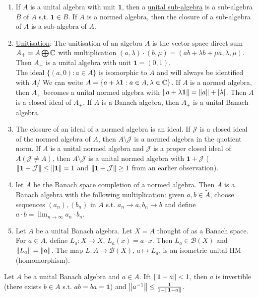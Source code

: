 \documentclass{article}
\begin{document}
\begin{enumerate}
    \item If $A$ is a unital algebra with unit $\mathbf{1}$, then a \noindent\underline{unital sub-algebra} is a sub-algebra $B$ of $A$ s.t. $\mathbf{1}\in B$. If $A$ is a normed algebra, then the closure of a sub-algebra of $A$ is a sub-algebra of $A$.
    \item \noindent\underline{Unitisation}: The unitisation of an algebra $A$ is the vector space direct sum $A_+ = A\bigoplus\mathbb{C}$ with multiplication $(a, \lambda)\cdot (b, \mu)=(ab+\lambda b+\mu a, \lambda, \mu)$. Then $A_+$ is a unital algebra with unit $\mathbf{1}=(0,1)$.\\

    The ideal $\{(a,0):a\in A\}$ is isomorphic to $A$ and will always be identified with $A$/ We can weite $A=\{a+\lambda\mathbf{1}:a\in A, \lambda\in \mathbb{C}\}$. If $A$ is a normed algebra, then $A_+$ becomes a unital normed algebra with $\left\lVert a+\lambda\mathbf{1}\right\rVert=\left\lVert a\right\rVert+|\lambda|$. Then $A$ is a closed ideal of $A_+$. If $A$ is a Banach algebra, then $A_+$ is a unital Banach algebra.\item The closure of an ideal of a normed algebra is an ideal. If $\mathcal{J}$ is a closed ideal of the normed algebra of $A$, then $A\setminus\mathcal{J}$ is a normed algebra in the quotient norm. If $A$ is a unital normed algebra and $\mathcal{J}$ is a proper closed ideal of $A (\mathcal{J}\neq A)$, then $A\setminus\mathcal{J}$ is a unital normed algebra with $\mathbf{1}+\mathcal{J}$ ($\left\lVert\mathbf{1}+\mathcal{J}\right\rVert\leq \left\lVert\mathbf{1}\right\rVert=1$ and $\left\lVert\mathbf{1}+\mathcal{J}\right\rVert\geq 1$ from an earlier observation).
    \item let $\tilde{A}$ be the Banach space completion of a normed algebra. Then $\tilde{A}$ is a Banach algebra with the following multiplication: given $a,b\in \tilde{A}$, choose sequences $(a_n), (b_n)$ in $A$ s.t. $a_n\to a, b_n\to b$ and define $a\cdot b = \displaystyle\lim_{n\to \infty}a_n\cdot b_n$.
    \item Let $A$ be a unital Banach algebra. Let $X=A$ thought of as a Banach space. For $a\in A$, define $L_a:X\to X$, $L_a(x) = a\cdot x$. Then $L_a\in \mathcal{B}(X)$ and $\left\lVert L_a\right\rVert=\left\lVert a\right\rVert$. The map $L:A\to \mathcal{B}(X)$, $a\mapsto L_a$, is an isometric unital HM (homomorphism).
\end{enumerate}

\begin{boxlemma}\label{lemma: BA inversion}
    Let $A$ be a unital Banach algebra and $a\in A$. Ift $\left\lVert\mathbf{1}-a\right\rVert<1$, then $a$ is invertible (there exists $b\in A$ s.t. $ab=ba=\mathbf{1}$) and $\left\lVert a^{-1}\right\rVert\leq \frac{1}{1-\left\lVert\mathbf{1}-a\right\rVert}$.
\end{boxlemma}
\end{document}
